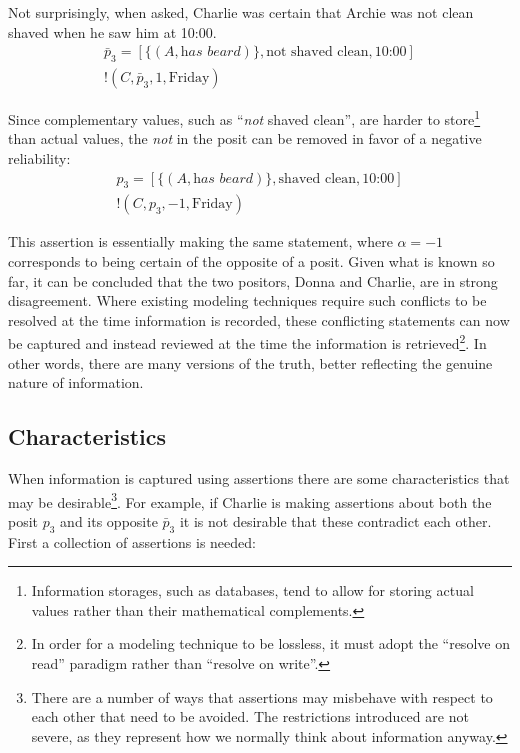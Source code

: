 \documentclass[sfsidenotes,nobib,twoside,symmetric]{tufte-handout}
\newcommand{\assert}{\text{!}}
\begin{document}
Not surprisingly, when asked, Charlie was certain that Archie was not clean shaved when he saw him at 10:00.
\begin{align*}
\bar{p}_{3} = [\{(A, \textit{has beard})\}, \textrm{not shaved clean}, \textrm{10:00}] \\
\assert(C, \bar{p}_{3}, 1, \textrm{Friday}) 
\end{align*}

Since complementary values, such as \enquote{\emph{not} shaved clean}, are harder to store\footnote{Information storages, such as databases, tend to allow for storing actual values rather than their mathematical complements.} than actual values, the \emph{not} in the posit can be removed in favor of a negative reliability:
\begin{align*}
p_{3} = [\{(A, \textit{has beard})\}, \textrm{shaved clean}, \textrm{10:00}] \\
\assert(C, p_{3}, -1, \textrm{Friday}) 
\end{align*}

This assertion is essentially making the same statement, where $\alpha = -1$ corresponds to being certain of the opposite of a posit. Given what is known so far, it can be concluded that the two positors, Donna and Charlie, are in strong disagreement. Where existing modeling techniques require such conflicts to be resolved at the time information is recorded, these conflicting statements can now be captured and instead reviewed at the time the information is retrieved\footnote{In order for a modeling technique to be lossless, it must adopt the \enquote{resolve on read} paradigm rather than \enquote{resolve on write}.}. In other words, there are many versions of the truth, better reflecting the genuine nature of information. 

\subsection{Characteristics}
%
When information is captured using assertions there are some characteristics that may be desirable\footnote{There are a number of ways that assertions may misbehave with respect to each other that need to be avoided. The restrictions introduced are not severe, as they represent how we normally think about information anyway.}. For example, if Charlie is making assertions about both the posit $p_{3}$ and its opposite $\bar{p}_{3}$ it is not desirable that these contradict each other. First a collection of assertions is needed:  
\end{document}
